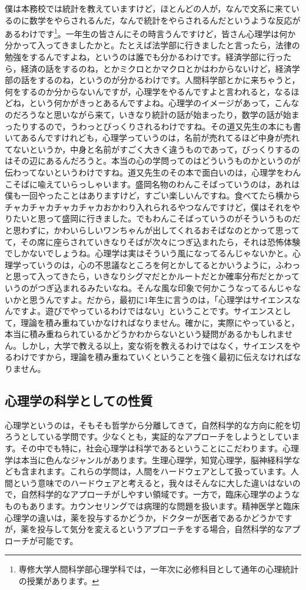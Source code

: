 \documentclass{ltjsbook}
\begin{document}
僕は本務校では統計を教えていますけど，ほとんどの人が，なんで文系に来ているのに数学をやらされるんだ，なんで統計をやらされるんだというような反応があるわけです\footnote{専修大学人間科学部心理学科では，一年次に必修科目として通年の心理統計の授業があります。}。一年生の皆さんにその時言うんですけど，皆さん心理学は何か分かって入ってきましたかと。たとえば法学部に行きましたと言ったら，法律の勉強をするんですよね，というのは誰でも分かるわけです。経済学部に行ったら，経済の話をするのね，とかミクロとかマクロとかはわからないけど，経済学部の話をするのね，というのが分かるわけです。人間科学部とかに来ちゃうと，何をするのか分からないんですが，心理学をやるんですよと言われると，なるほどね，という何かがきっとあるんですよね。心理学のイメージがあって，こんなのだろうなと思いながら来て，いきなり統計の話が始まったり，数学の話が始まったりするので，うわっとびっくりされるわけですね。その道又先生の本\parencite{Michimata200903}にも書いてあるんですけれども，心理学っていうのは，名前が売れてるほど中身が売れてないというか，中身と名前がすごく大きく違うものであって，びっくりするのはその辺にあるんだろうと。本当の心の学問ってのはどういうものかというのが伝わってないというわけですね。道又先生のその本で面白いのは，心理学をわんこそばに喩えていらっしゃいます。盛岡名物のわんこそばっていうのは，あれは僕も一回やったことはありますけど，すごい楽しいんですね。食べてたら横からチャカチャカチャカチャカおかわり入れられるやつなんですけど，僕はそれをやりたいと思って盛岡に行きました。でもわんこそばっていうのがそういうものだと思わずに，かわいらしいワンちゃんが出してくれるおそばなのとかって思ってて，その席に座らされていきなりそばが次々につぎ込まれたら，それは恐怖体験でしかないでしょうね。心理学は実はそういう風になってるんじゃないかと。心理学っていうのは，心の不思議なところを何とかしてるとかいうように，ふわっと思って入ってきたら，いきなりシグマだとかルートだとか確率分布だとかっていうのがつぎ込まれるみたいなね。そんな風な印象で何かこうなってるんじゃないかと思うんですよ。だから，最初に1年生に言うのは，「心理学はサイエンスなんですよ。遊びでやっているわけではない」ということです。サイエンスとして，理論を積み重ねていかなければなりません。確かに，実際にやっていると，本当に積み重ねられているかどうかわからないという疑問があるかもしれません。しかし，大学で教える以上，変な術を教えるわけではなく，サイエンスをやるわけですから，理論を積み重ねていくということを強く最初に伝えなければなりません。

\subsection{心理学の科学としての性質}
心理学というのは，そもそも哲学から分離してきて，自然科学的な方向に舵を切ろうとしている学問です。少なくとも，実証的なアプローチをしようとしています。その中でも特に，社会心理学は科学であるということにこだわります。心理学は本当に色んなジャンルがあります。生理心理学，知覚心理学，脳神経科学なども含まれます。これらの学問は，人間をハードウェアとして扱っています。人間という意味でのハードウェアと考えると，我々はそんなに大した違いはないので，自然科学的なアプローチがしやすい領域です。一方で，臨床心理学のようなものもあります。カウンセリングでは病理的な問題を扱います。精神医学と臨床心理学の違いは，薬を投与するかどうか，ドクターが医者であるかどうかですが，薬を投与して気分を変えるというアプローチをする場合，自然科学的なアプローチが可能です。
\end{document}
